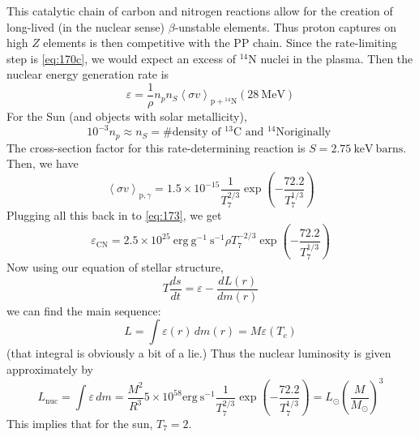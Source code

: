 \documentclass[10pt]{article}
\numberwithin{equation}{section}
\newcommand{\avg}[1]{\left\langle#1\right\rangle}
\begin{document}
  This catalytic chain of carbon and nitrogen reactions allow for
  the creation of long-lived (in the nuclear sense) $\beta$-unstable
  elements. Thus proton captures on high $Z$ elements is then
  competitive with the PP chain. Since the rate-limiting step is
  \eqref{eq:170c}, we would expect an excess of $\mathrm{{}^{14}N}$
    nuclei in the plasma. Then the nuclear energy generation rate is
    \begin{equation}
      \label{eq:173}
      \varepsilon = \frac{1}{\rho}n_pn_S\avg{\sigma
        v}_{\mathrm{p+{}^{14}N}}\left(28\ \mathrm{MeV}\right)
    \end{equation}
    For the Sun (and objects with solar metallicity),
    \begin{equation}
      \label{eq:174}
      10^{-3}n_p\approx n_S=\textrm{\# density of
      }\mathrm{{}^{13}C}\textrm{ and }\mathrm{{}^{14}N}\textrm{
        originally }
    \end{equation}
    The cross-section factor for this rate-determining reaction is
    $S=2.75\ \mathrm{keV\ barns}$. Then, we have
    \begin{equation}
      \label{eq:175}
      \avg{\sigma v}_{\mathrm{p},\gamma}=1.5\times 10^{-15}\frac{1}{T_7^
{2/3}}\exp\left(-\frac{72.2}{T_7^{1/3}}\right)
    \end{equation}
    Plugging all this back in to \eqref{eq:173}, we get
    \begin{equation}
      \label{eq:176}
      \varepsilon_{\mathrm{CN}}=2.5\times 10^{25}\ \mathrm{erg\
        g^{-1}\ s^{-1}}\rho T_7^{-2/3}\exp\left(-\frac{72.2}{T_7^{1/3}}
\right)
    \end{equation}
    Now using our equation of stellar structure,
    \begin{equation}
      \label{eq:177}
      T\frac{ds}{dt}=\varepsilon-\frac{dL(r)}{dm(r)}
    \end{equation}
    we can find the main sequence:
    \begin{equation}
      \label{eq:178}
      L=\int \varepsilon(r)\,dm(r)=M\varepsilon(T_c)
    \end{equation}
    (that integral is obviously a bit of a lie.) Thus the nuclear luminosity is given approximately by
    \begin{equation}
      \label{eq:179}
      L_{\mathrm{nuc}}=\int \varepsilon\, dm=\frac{M^2}{R^3}5\times
      10^{58}\mathrm{erg\
        s^{-1}}\frac{1}{T_7^{2/3}}\exp\left(-\frac{72.2}{T_7^{1/3}}\right)
=L_\odot \left(\frac{M}{M_\odot}\right)^3
    \end{equation}
    This implies that for the sun, $T_7=2$.
\end{document}
